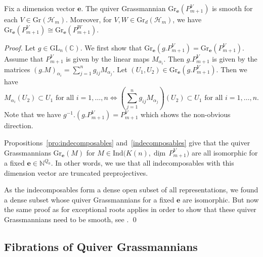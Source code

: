 \documentclass[smallextended,envcountsect,envcountsame]{svjour3}
\numberwithin{equation}{section}
\newcommand{\CC}{\mathbb{C}}
\newcommand{\NN}{\mathbb{N}}
\newcommand{\bfe}{\mathbf{e}}
\newcommand{\cH}{\mathcal{H}}
\newcommand\udim{{\underline{\dim}\, }}
\newcommand{\Gr}{\mathrm{Gr}}
\newcommand{\GL}{\mathrm{GL}}
\newcommand{\Ind}{\mathrm{Ind}}
\begin{document}
\begin{theorem}
  \label{thm:truncpp}
  Fix a dimension vector $\bfe$.
  The quiver Grassmannian $\Gr_\bfe(P_{m+1}^V)$ is smooth for each $V\in \Gr(\cH_m)$.
  Moreover, for $V,W\in \Gr_d(\cH_m)$, we have $\Gr_\bfe(P_{m+1}^V)\cong \Gr_\bfe(P_{m+1}^W)$.
\end{theorem}
\begin{proof}
  Let $g\in\GL_n(\CC)$.
  We first show that $\Gr_\bfe(g.P_{m+1}^V)=\Gr_\bfe(P_{m+1}^V)$.
  Assume that $P_{m+1}^V$ is given by the linear maps $M_{\alpha_i}$.
  Then $g.P_{m+1}^V$ is given by the matrices $(g.M)_{\alpha_i}=\sum\limits_{j=1}^n g_{ij}M_{\alpha_j}$.
  Let $(U_1,U_2)\in\Gr_\bfe(g.P_{m+1}^V)$.
  Then we have  
  \[M_{\alpha_i}(U_2)\subset U_1 \text{ for all } i=1,\ldots,n\Leftrightarrow \left(\sum\limits_{j=1}^n g_{ij}M_{\alpha_j}\right)(U_2)\subset U_1 \text{ for all } i=1,\ldots,n.\]
  Note that we have $g^{-1}.(g.P_{m+1}^V)=P_{m+1}^V$ which shows the non-obvious direction.

  Propositions~\ref{pro:indecomposables} and~\ref{indecomposables} give that the quiver Grassmannians $\Gr_\bfe(M)$ for $M\in\Ind\big(K(n),\udim P_{m+1}^V\big)$ are all isomorphic for a fixed $\bfe\in\NN^{Q_0}$.
  In other words, we use that all indecomposables with this dimension vector are truncated preprojectives.

  As the indecomposables form a dense open subset of all representations, we found a dense subset whose quiver Grassmannians for a fixed $\bfe$ are isomorphic.
  But now the same proof as for exceptional roots applies in order to show that these quiver Grassmannians need to be smooth, see \cite[Corollary 4]{cr}.
\qed\end{proof}


\subsection{Fibrations of Quiver Grassmannians}
\label{sec:fibrations}
\end{document}
